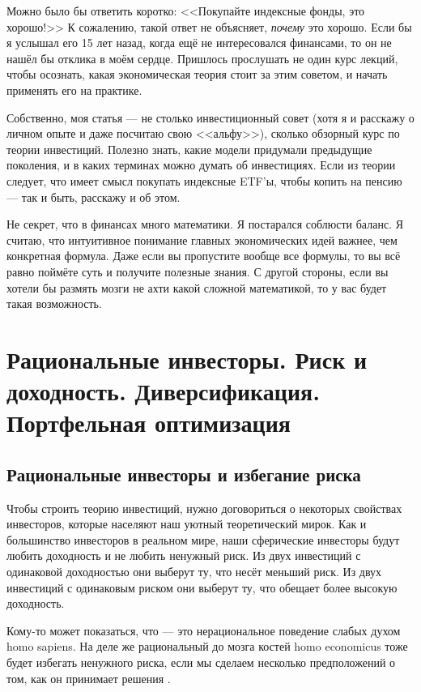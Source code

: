 Можно было бы ответить коротко: <<Покупайте индексные фонды, это хорошо!>> К 
сожалению, такой ответ не объясняет, \emph{почему} это хорошо. Если бы я 
услышал его 15 лет назад, когда ещё не интересовался финансами, то он не нашёл 
бы отклика в моём сердце. Пришлось прослушать не один курс лекций, чтобы 
осознать, какая экономическая теория стоит за этим советом, и начать применять 
его на практике.

Собственно, моя статья --- не столько инвестиционный совет (хотя я и расскажу о
личном опыте и даже посчитаю свою <<альфу>>), сколько обзорный курс по теории 
инвестиций. Полезно знать, какие модели придумали предыдущие поколения, и в 
каких терминах можно думать об инвестициях. Если из теории следует, что имеет 
смысл покупать индексные ETF'ы, чтобы копить на пенсию --- так и быть, расскажу 
и об этом.

Не секрет, что в финансах много математики. Я постарался соблюсти баланс. Я 
считаю, что интуитивное понимание главных экономических идей важнее, чем 
конкретная формула. Даже если вы пропустите вообще все формулы, то вы всё равно 
поймёте суть и получите полезные знания. С другой стороны, если вы хотели бы 
размять мозги не ахти какой сложной математикой, то у вас будет такая 
возможность.

\clearpage
\section{Рациональные инвесторы. Риск и доходность. Диверсификация. Портфельная
оптимизация}

\subsection{Рациональные инвесторы и избегание риска}

Чтобы строить теорию инвестиций, нужно договориться о некоторых свойствах 
инвесторов, которые населяют наш уютный теоретический мирок. Как и большинство 
инвесторов в реальном мире, наши сферические инвесторы будут любить доходность и 
не любить ненужный риск. Из двух инвестиций с одинаковой доходностью они выберут 
ту, что несёт меньший риск. Из двух инвестиций с одинаковым риском они выберут 
ту, что обещает более высокую доходность.

Кому-то может показаться, что  --- это
нерациональное поведение слабых духом homo sapiens. На деле же рациональный до
мозга костей homo economicus тоже будет избегать ненужного риска, если мы
сделаем несколько предположений о том, как он принимает решения
\cite[ch.~6.1]{bodie2014investments}.
 
